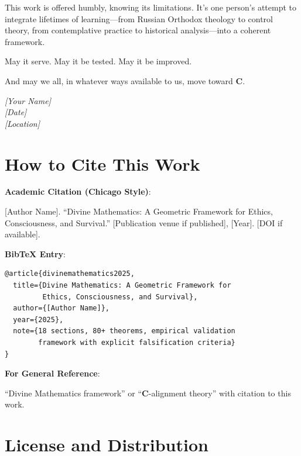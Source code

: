 \documentclass[11pt,a4paper]{article}
\theoremstyle{definition}
\theoremstyle{remark}
\begin{document}
\begin{enumerate}
\begin{protocol}
This work is offered humbly, knowing its limitations. It's one person's attempt to integrate lifetimes of learning—from Russian Orthodox theology to control theory, from contemplative practice to historical analysis—into a coherent framework.

May it serve. May it be tested. May it be improved.

And may we all, in whatever ways available to us, move toward \(\mathbf{C}\).

\vspace{1em}

\begin{flushright}
\textit{[Your Name]}\\
\textit{[Date]}\\
\textit{[Location]}
\end{flushright}

\vspace{2em}

\section*{How to Cite This Work}

\textbf{Academic Citation (Chicago Style)}:

[Author Name]. ``Divine Mathematics: A Geometric Framework for Ethics, Consciousness, and Survival.'' [Publication venue if published], [Year]. [DOI if available].

\textbf{BibTeX Entry}:

\begin{verbatim}
@article{divinemathematics2025,
  title={Divine Mathematics: A Geometric Framework for 
         Ethics, Consciousness, and Survival},
  author={[Author Name]},
  year={2025},
  note={18 sections, 80+ theorems, empirical validation 
        framework with explicit falsification criteria}
}
\end{verbatim}

\textbf{For General Reference}:

``Divine Mathematics framework'' or ``\(\mathbf{C}\)-alignment theory'' with citation to this work.

\vspace{2em}

\section*{License and Distribution}


\end{protocol}
\end{enumerate}
\end{document}
